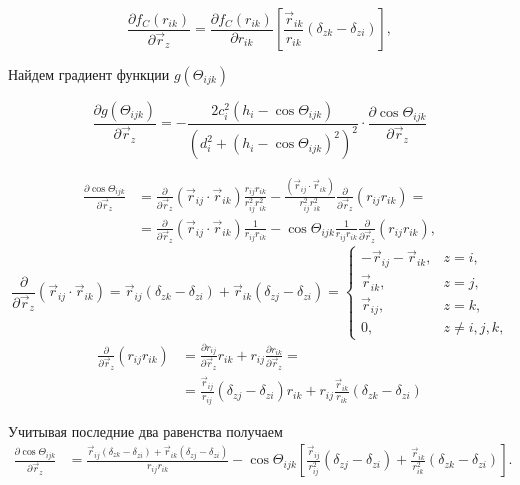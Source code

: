\begin{equation}
\frac{\partial f_C(r_{ik})}{\partial \vec{r}_z} =  \frac{\partial f_C(r_{ik})}{\partial r_{ik}} \left[ \frac{\vec {r}_{ik}}{r_{ik}}\left(\delta_{zk} - \delta_{zi}\right)\right],
\end{equation}

Найдем градиент функции $g(\Theta_{ijk})$

\begin{equation}
\frac{\partial g(\Theta_{ijk})}{\partial \vec{r}_z} = 
	-\frac{2c_i^2 (h_i - \cos\Theta_{ijk})}{(d_i^2 + (h_i - \cos\Theta_{ijk})^2)^2} \cdot
	\frac{\partial \cos\Theta_{ijk}}{\partial \vec{r}_z}
\end{equation}

\begin{align*}
\frac{\partial \cos\Theta_{ijk}}{\partial \vec{r}_z} & =  \frac{\partial}{\partial \vec{r}_z}\left( \vec{r}_{ij}\cdot\vec{r}_{ik}\right) \frac{r_{ij} r_{ik}}{r^2_{ij} r^2_{ik}} -  \frac{(\vec{r}_{ij}\cdot\vec{r}_{ik}) }{r^2_{ij} r^2_{ik}}\frac{\partial}{\partial \vec{r}_z} (r_{ij} r_{ik}) = \\
  & = \frac{\partial}{\partial \vec{r}_z}\left( \vec{r}_{ij}\cdot\vec{r}_{ik}\right) \frac{1}{r_{ij} r_{ik}} -  \cos\Theta_{ijk} \frac{1}{r_{ij} r_{ik}}  \frac{\partial}{\partial \vec{r}_z} (r_{ij} r_{ik}), 
\end{align*}
\[
\frac{\partial}{\partial \vec{r}_z}(\vec{r}_{ij}\cdot\vec{r}_{ik}) = \vec{r}_{ij}(\delta_{zk} - \delta_{zi}) + \vec{r}_{ik}(\delta_{zj} - \delta_{zi}) = 
\begin{cases}
-\vec{r}_{ij} -  \vec{r}_{ik}, &\text{$z = i$,}\\
\vec{r}_{ik}, &\text{$z = j$,}\\
\vec{r}_{ij}, &\text{$z = k$,}\\
0, &\text{$z \neq i, j, k$,}
\end{cases}
\]
\begin{align*}
\frac{\partial}{\partial \vec{r}_z}(r_{ij}r_{ik})  & = \frac{\partial r_{ij}}{\partial \vec{r}_z}r_{ik} +  r_{ij} \frac{\partial r_{ik}}{\partial \vec{r}_z} = \\
& = \frac{\vec {r}_{ij}}{r_{ij}}(\delta_{zj} - \delta_{zi})r_{ik} + r_{ij}\frac{\vec {r}_{ik}}{r_{ik}}\left(\delta_{zk} - \delta_{zi}\right)
\end{align*}

Учитывая последние два равенства получаем
\begin{align*}
\frac{\partial \cos\Theta_{ijk}}{\partial \vec{r}_z}  & =  \frac{\vec{r}_{ij}(\delta_{zk} - \delta_{zi}) + \vec{r}_{ik}(\delta_{zj} - \delta_{zi})}{r_{ij}r_{ik}} -
\cos\Theta_{ijk} \left[ \frac{\vec {r}_{ij}}{r^2_{ij}}(\delta_{zj} - \delta_{zi}) + \frac{\vec {r}_{ik}}{r^2_{ik}}\left(\delta_{zk} - \delta_{zi}\right) \right]. 
\end{align*}